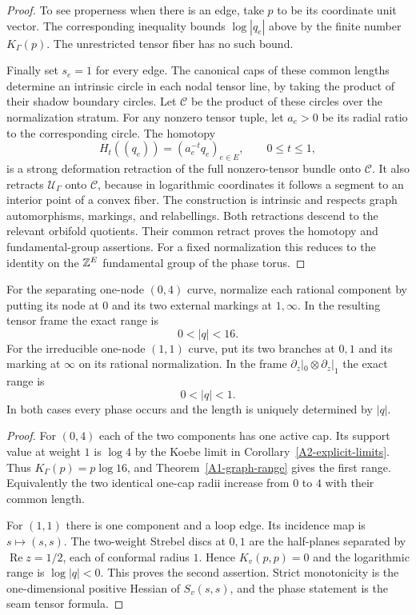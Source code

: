 \begin{proof}
To see properness when there is an edge, take $p$ to be its coordinate
unit vector. The corresponding inequality bounds $\log|q_e|$ above
by the finite number $K_\Gamma(p)$. The unrestricted tensor fiber
has no such bound.

Finally set $s_e=1$ for every edge. The canonical caps of these common
lengths determine an intrinsic circle in each nodal tensor line, by
taking the product of their shadow boundary circles. Let $\mathcal C$
be the product of these circles over the normalization stratum.
For any nonzero tensor tuple, let $a_e>0$ be its radial ratio to the
corresponding circle. The homotopy
\[
 H_t((q_e))=(a_e^{-t}q_e)_{e\in E},\qquad0\leq t\leq1,
\]
is a strong deformation retraction of the full nonzero-tensor bundle
onto $\mathcal C$. It also retracts $\mathcal U_\Gamma$ onto
$\mathcal C$, because in logarithmic coordinates it follows a segment
to an interior point of a convex fiber. The construction is intrinsic
and respects graph automorphisms, markings, and relabellings. Both
retractions descend to the relevant orbifold quotients. Their common
retract proves the homotopy and fundamental-group assertions.
For a fixed normalization this reduces to the identity on the
${\mathbb{Z}}^E$ fundamental group of the phase torus.
\end{proof}

\begin{corollary}
\label{A1-small-ranges}
For the separating one-node $(0,4)$ curve, normalize each rational
component by putting its node at $0$ and its two external markings at
$1,\infty$. In the resulting tensor frame the exact range is
\[
                         0<|q|<16.
\]
For the irreducible one-node $(1,1)$ curve, put its two branches at
$0,1$ and its marking at $\infty$ on its rational normalization.
In the frame $\partial_z|_0\otimes\partial_z|_1$ the exact range is
\[
                         0<|q|<1.
\]
In both cases every phase occurs and the length is uniquely determined
by $|q|$.
\end{corollary}
\begin{proof}
For $(0,4)$ each of the two components has one active cap. Its support
value at weight $1$ is $\log4$ by the Koebe limit in
Corollary~\ref{A2-explicit-limits}. Thus
$K_\Gamma(p)=p\log16$, and Theorem~\ref{A1-graph-range} gives the
first range. Equivalently the two identical one-cap radii increase
from $0$ to $4$ with their common length.

For $(1,1)$ there is one component and a loop edge. Its incidence map
is $s\mapsto(s,s)$. The two-weight Strebel discs at $0,1$ are the
half-planes separated by $\operatorname{Re}z=1/2$, each of conformal
radius $1$. Hence $K_v(p,p)=0$ and the logarithmic range is
$\log|q|<0$. This proves the second assertion. Strict monotonicity
is the one-dimensional positive Hessian of $S_v(s,s)$, and the
phase statement is the seam tensor formula.
\end{proof}

